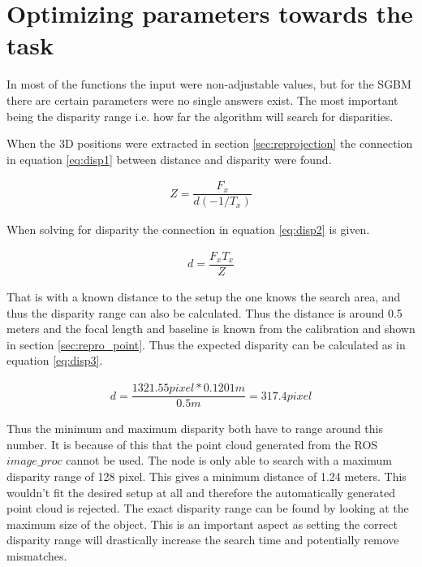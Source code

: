 \section{ Optimizing parameters towards the task } \label{sec:optimizing_parameters}

In most of the functions the input were non-adjustable values, but for the SGBM there are certain parameters were no single answers exist. The most important being the disparity range i.e. how far the algorithm will search for disparities.


When the 3D positions were extracted in section \ref{sec:reprojection} the connection in equation \ref{eq:disp1} between distance and disparity were found.

\begin{equation}\label{eq:disp1}
\begin{split}
Z = \dfrac{F_{x}}{ d(-1/T_{x})}
\end{split}
\end{equation} 

When solving for disparity the connection in equation \ref{eq:disp2} is given.

\begin{equation}\label{eq:disp2}
\begin{split}
 d = \dfrac{F_{x}T_{x}}{ Z}
\end{split}
\end{equation} 

That is with a known distance to the setup the one knows the search area, and thus the disparity range can also be calculated. Thus the distance is around 0.5 meters and the focal length and baseline is known from the calibration and shown in section \ref{sec:repro_point}. Thus the expected disparity can be calculated as in equation \ref{eq:disp3}.

\begin{equation}\label{eq:disp3}
\begin{split}
d = \dfrac{1321.55 pixel*0.1201m}{0.5m} = 317.4 pixel
\end{split}
\end{equation}

Thus the minimum and maximum disparity both have to range around this number. It is because of this that the point cloud generated from the ROS $image\_proc$ cannot be used. The node is only able to search with a maximum disparity range of 128 pixel. This gives a minimum distance of 1.24 meters. This wouldn't fit the desired setup at all and therefore the automatically generated point cloud is rejected. The exact disparity range can be found by looking at the maximum size of the object. This is an important aspect as setting the correct disparity range will drastically increase the search time and potentially remove mismatches.

